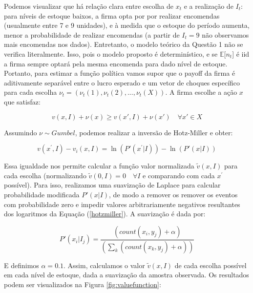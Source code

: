 \documentclass{article}
\begin{document}
Podemos visualizar que há relação clara entre escolha de $x_t$ e a realização de $I_t$: para níveis de estoque baixos, a firma opta por por realizar encomendas (usualmente entre 7 e 9 unidades), e à medida que o estoque do período aumenta, menor a probabilidade de realizar encomendas (a partir de $I_t = 9$ não observamos mais encomendas nos dados). Entretanto, o modelo teórico da Questão 1 não se verifica literalmente. Isso, pois o modelo proposto é determinístico, e se $\mathbb{E}[n_t$] é iid a firma sempre optará pela mesma encomenda para dado nível de estoque. Portanto, para estimar a função política vamos supor que o payoff da firma é aditivamente separável entre o lucro esperado e um vetor de choques específico para cada escolha $\nu_t = (\nu_t(1), \nu_t(2), ..., \nu_t(X))$. A firma escolhe a ação $x$ que satisfaz:

\begin{equation*}
    v(x,I)+\nu(x)\geq v(x',I)+\nu(x')\quad\forall x'\in X
\end{equation*}

Assumindo $\nu \sim Gumbel$, podemos realizar a inversão de Hotz-Miller e obter:

\begin{equation}\label{hotzmiller}
    v(x^{\prime},I)-v_i(x,I)=\ln(P'(x^{\prime}|I))-\ln(P'(x|I))
\end{equation}

Essa igualdade nos permite calcular a função valor normalizada $\tilde{v}(x,I)$ para cada escolha (normalizando $\tilde{v}(0,I) = 0 \quad \forall I$ e comparando com cada $x^{\prime}$ possível). Para isso, realizamos uma suavização de Laplace para calcular probabilidade modificada $P'(x | I)$, de modo a remover os remover os eventos com probabilidade zero e impedir valores arbitrariamente negativos resultantes dos logaritmos da Equação (\ref{hotzmiller}). A suavização é dada por:

\begin{equation*}
    P'(x_i | I_j) = \frac{(count(x_i, y_j) + \alpha)}{(\sum_{k} (count(x_k, y_j) + \alpha))}
\end{equation*}

E definimos $\alpha = 0.1$. Assim, calculamos o valor $\tilde{v}(x,I)$ de cada escolha possível em cada nível de estoque, dada a suavização da amostra observada. Os resultados podem ser visualizados na Figura \ref{fig:valuefunction}:
\end{document}
